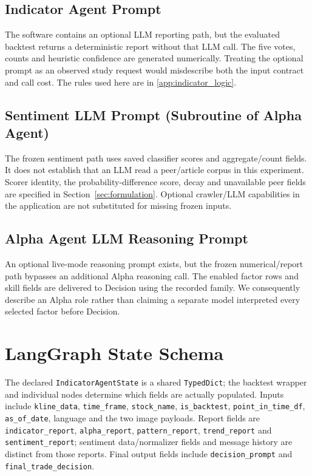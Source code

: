 \subsection{Indicator Agent Prompt}
\label{app:prompt_indicator}
The software contains an optional LLM reporting path, but the evaluated backtest returns a deterministic report without that LLM call. The five votes, counts and heuristic confidence are generated numerically. Treating the optional prompt as an observed study request would misdescribe both the input contract and call cost. The rules used here are in \ref{app:indicator_logic}.

\subsection{Sentiment LLM Prompt (Subroutine of Alpha Agent)}
\label{app:prompt_sentiment}
The frozen sentiment path uses saved classifier scores and aggregate/count fields. It does not establish that an LLM read a peer/article corpus in this experiment. Scorer identity, the probability-difference score, decay and unavailable peer fields are specified in Section~\ref{sec:formulation}. Optional crawler/LLM capabilities in the application are not substituted for missing frozen inputs.

\subsection{Alpha Agent LLM Reasoning Prompt}
\label{app:prompt_alpha}
An optional live-mode reasoning prompt exists, but the frozen numerical/report path bypasses an additional Alpha reasoning call. The enabled factor rows and skill fields are delivered to Decision using the recorded family. We consequently describe an Alpha role rather than claiming a separate model interpreted every selected factor before Decision.

\FloatBarrier
\section{LangGraph State Schema}
\label{app:state_schema}
The declared \texttt{IndicatorAgentState} is a shared \texttt{TypedDict}; the backtest wrapper and individual nodes determine which fields are actually populated. Inputs include \texttt{kline\_data}, \texttt{time\_frame}, \texttt{stock\_name}, \texttt{is\_backtest}, \texttt{point\_in\_time\_df}, \texttt{as\_of\_date}, language and the two image payloads. Report fields are \texttt{indicator\_report}, \texttt{alpha\_report}, \texttt{pattern\_report}, \texttt{trend\_report} and \texttt{sentiment\_report}; sentiment data/normalizer fields and message history are distinct from those reports. Final output fields include \texttt{decision\_prompt} and \texttt{final\_trade\_decision}.

